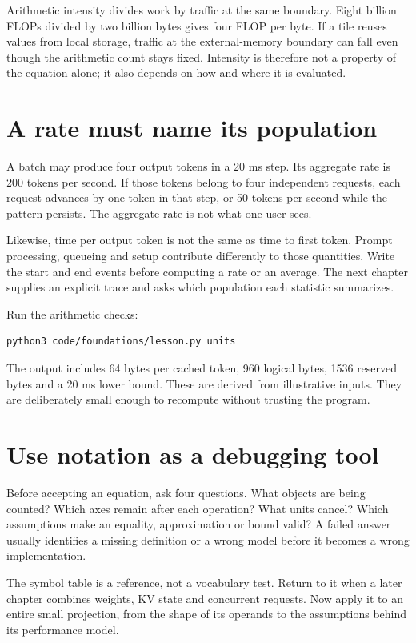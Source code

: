 Arithmetic intensity divides work by traffic at the same boundary.
Eight billion FLOPs divided by two billion bytes gives four FLOP
per byte. If a tile reuses values from local storage, traffic at the
external-memory boundary can fall even though the arithmetic count
stays fixed. Intensity is therefore not a property of the equation
alone; it also depends on how and where it is evaluated.

\section{A rate must name its population}
A batch may produce four output tokens in a 20 ms step. Its aggregate
rate is 200 tokens per second. If those tokens belong to four
independent requests, each request advances by one token in that
step, or 50 tokens per second while the pattern persists.
The aggregate rate is not what one user sees.

Likewise, time per output token is not the same as time to first
token. Prompt processing, queueing and setup contribute differently
to those quantities. Write the start and end events before computing
a rate or an average. The next chapter supplies an explicit trace
and asks which population each statistic summarizes.

Run the arithmetic checks:
\begin{verbatim}
python3 code/foundations/lesson.py units
\end{verbatim}
The output includes 64 bytes per cached token, 960 logical bytes,
1536 reserved bytes and a 20 ms lower bound. These are derived from
illustrative inputs. They are deliberately small enough to recompute
without trusting the program.

\section{Use notation as a debugging tool}
Before accepting an equation, ask four questions. What objects are
being counted? Which axes remain after each operation? What units
cancel? Which assumptions make an equality, approximation or bound
valid? A failed answer usually identifies a missing definition or
a wrong model before it becomes a wrong implementation.

The symbol table is a reference, not a vocabulary test. Return to
it when a later chapter combines weights, KV state and concurrent
requests. Now apply it to an entire small projection, from the shape
of its operands to the assumptions behind its performance model.

